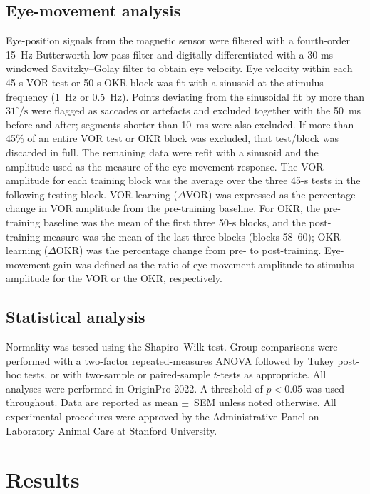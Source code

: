 \documentclass[11pt]{article}
\begin{document}
\subsection{Eye-movement analysis}

Eye-position signals from the magnetic sensor were filtered with a
fourth-order 15~Hz Butterworth low-pass filter and digitally differentiated
with a 30-ms windowed Savitzky--Golay filter to obtain eye velocity. Eye
velocity within each 45-s VOR test or 50-s OKR block was fit with a
sinusoid at the stimulus frequency (1~Hz or 0.5~Hz). Points deviating from
the sinusoidal fit by more than $31^{\circ}/\text{s}$ were flagged as
saccades or artefacts and excluded together with the 50~ms before and after;
segments shorter than 10~ms were also excluded. If more than 45\% of an
entire VOR test or OKR block was excluded, that test/block was discarded
in full. The remaining data were refit with a sinusoid and the amplitude
used as the measure of the eye-movement response. The VOR amplitude for
each training block was the average over the three 45-s tests in the
following testing block. VOR learning ($\Delta$VOR) was expressed as the
percentage change in VOR amplitude from the pre-training baseline. For
OKR, the pre-training baseline was the mean of the first three 50-s
blocks, and the post-training measure was the mean of the last three
blocks (blocks 58--60); OKR learning ($\Delta$OKR) was the percentage
change from pre- to post-training. Eye-movement gain was defined as the
ratio of eye-movement amplitude to stimulus amplitude for the VOR or the
OKR, respectively.

\subsection{Statistical analysis}

Normality was tested using the Shapiro--Wilk test. Group comparisons were
performed with a two-factor repeated-measures ANOVA followed by Tukey
post-hoc tests, or with two-sample or paired-sample $t$-tests as
appropriate. All analyses were performed in OriginPro 2022. A threshold
of $p < 0.05$ was used throughout. Data are reported as mean $\pm$~SEM
unless noted otherwise. All experimental procedures were approved by the
Administrative Panel on Laboratory Animal Care at Stanford University.

\section{Results}
\end{document}
